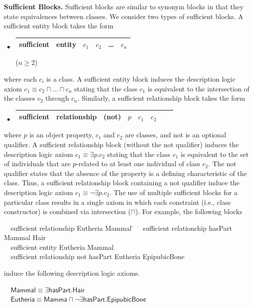 \documentclass[5p,authoryear]{elsarticle}
\newcommand{\myblock}[1]{\vspace{12pt}\noindent\textbf{#1}}
\begin{document}
\myblock{Sufficient Blocks.} Sufficient blocks are similar to synonym blocks in that they state equivalences between classes. We consider two types of sufficient blocks. A sufficient entity block takes the form
\begin{itemize}
\item[]
  \begin{tabular}{|l|l|l|l|l|l|}\hline \textsf{sufficient} & \textsf{entity} & $c_1$ & $c_2$ & \dots & $c_n$
\\ \hline
\end{tabular} \hfill ($n \ge 2$)
\end{itemize}
where each $c_i$ is a class. A sufficient entity block induces the description logic axiom $c_1 \equiv c_2 \sqcap \dots \sqcap c_n$ stating that the class $c_1$ is equivalent to the intersection of the classes $c_2$ through $c_n$.  Similarly, a sufficient relationship block takes the form
\begin{itemize}
\item[]
  \begin{tabular}{|l|l|l|l|l|l|l|l|}\hline \textsf{sufficient} & \textsf{relationship} & (\textsf{not}) & $p$ & $c_1$ & $c_2$ \\ \hline \end{tabular} \end{itemize} where $p$ is an object property, $c_1$ and $c_2$ are classes, and \textsf{not} is an optional qualifier.  A sufficient relationship block (without the \textsf{not} qualifier) induces the description logic axiom $c_1 \equiv \exists p . c_2$ stating that the class $c_1$ is equivalent to the set of individuals that are $p$-related to at least one individual of class $c_2$. The \textsf{not} qualifier states that the absence of the property is a defining characteristic of the class. Thus, a sufficient relationship block containing a \textsf{not} qualifier induce the description logic axiom $c_1 \equiv \neg \exists p . c_2$.  The use of multiple sufficient blocks for a particular class results in a single axiom in which each constraint (i.e., class constructor) is combined via intersection ($\sqcap$). For example, the following blocks 
\begin{small}
\begin{tabbing}
~~\textsf{sufficient} \= \textsf{relationship} \= \textsf{Eutheria} \= \textsf{Mammal} \= \kill 
~~\textsf{sufficient} \> \textsf{relationship} \> \textsf{hasPart} \> \textsf{Mammal} \> \textsf{Hair} \\
  ~~\textsf{sufficient} \> \textsf{entity} \> \textsf{Eutheria} \> \textsf{Mammal} \\
  ~~\textsf{sufficient} \> \textsf{relationship} \> \textsf{not} \> \textsf{hasPart} \> \textsf{Eutheria}  \textsf{EpipubicBone} 
\end{tabbing}
induce the following description logic axioms.
\begin{tabbing}
~~$\textsf{Mammal} \equiv \exists \textsf{hasPart}.\textsf{Hair}$\\ 
~~$\textsf{Eutheria} \equiv \textsf{Mamma} \sqcap \neg \exists \textsf{hasPart} . \textsf{EpipubicBone}$
\end{tabbing}
\end{small}
\end{document}
